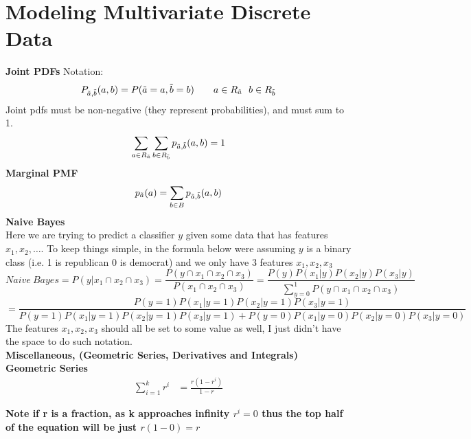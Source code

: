 \documentclass[12pt,twoside]{article}
\begin{document}
\newpage 

\section{Modeling Multivariate Discrete Data}
\textbf{Joint PDFs}
Notation:
$$
    P_{\Tilde{a},\Tilde{b}}(a,b) = P(\Tilde{a}=a, \Tilde{b}=b) \qquad a \in R_{\Tilde{a}} \ \  b \in R_{\Tilde{b}}
$$
Joint pdfs must be non-negative (they represent probabilities), and must sum to 1.
$$
    \sum_{a\in R_{\Tilde{a}}} \sum_{b \in R_{\Tilde{b}}} p_{\Tilde{a},\Tilde{b}}(a,b) = 1
$$  
\textbf{Marginal PMF}
$$
    p_{\Tilde{a}}(a) = \sum_{b \in B} p_{\Tilde{a},\Tilde{b}}(a,b)
$$
\textbf{Naive Bayes}\\

Here we are trying to predict a classifier $y$ given some data that has features $x_1,x_2,\dots$. To keep things simple, in the formula below were assuming $y$ is a binary class (i.e. 1 is republican 0 is democrat) and we only have 3 features $x_1, x_2,x_3$
$$
    Naive \ Bayes = P(y|x_1\cap x_2 \cap x_3) = \frac{P(y\cap x_1 \cap x_2 \cap x_3)}{P(x_1\cap x_2 \cap x_3)} = \frac{P(y)P(x_1|y)P(x_2|y)P(x_3|y)}{\sum_{y=0}^1 P(y\cap x_1 \cap x_2 \cap x_3)}
$$
$$
    = \frac{P(y=1)P(x_1|y=1)P(x_2|y=1)P(x_3|y=1)}{P(y=1)P(x_1 |y=1)P(x_2|y=1)P(x_3|y=1) + P(y=0)P(x_1|y=0)P(x_2|y=0)P(x_3|y=0)}
$$
The features $x_1,x_2, x_3$ should all be set to some value as well, I just didn't have the space to do such notation.
\\

\textbf{Miscellaneous, (Geometric Series, Derivatives and Integrals)}\\

\textbf{Geometric Series}
\begin{equation}
\begin{split}
    \sum_{i=1}^{k} r^i &= \frac{r(1-r^i)}{1-r}
\end{split}
\end{equation}

\textbf{Note if r is a fraction, as k approaches infinity $r^i=0$ thus the top half of the equation will be just $r(1-0)=r$}
\end{document}
